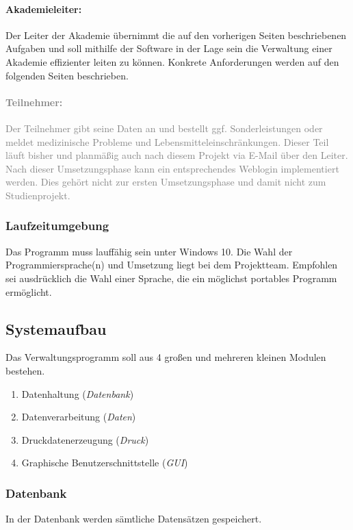 \documentclass[a4paper]{scrartcl}
\begin{document}
	\paragraph{Akademieleiter:}
	Der Leiter der Akademie übernimmt die auf den vorherigen Seiten beschriebenen Aufgaben und soll mithilfe der Software in der Lage sein die Verwaltung einer Akademie effizienter leiten zu können. Konkrete Anforderungen werden auf den folgenden Seiten beschrieben.
	\textcolor{gray}{\paragraph{Teilnehmer:}
	Der Teilnehmer gibt seine Daten an und bestellt ggf. Sonderleistungen oder meldet medizinische Probleme und Lebensmitteleinschränkungen. Dieser Teil läuft bisher und planmäßig auch nach diesem Projekt via E-Mail über den Leiter. Nach dieser Umsetzungsphase kann ein entsprechendes Weblogin implementiert werden. Dies gehört nicht zur ersten Umsetzungsphase und damit nicht zum Studienprojekt.}

	\subsubsection{Laufzeitumgebung}
	Das Programm muss lauffähig sein unter Windows 10. Die Wahl der Programmiersprache(n) und Umsetzung liegt bei dem Projektteam. Empfohlen sei ausdrücklich die Wahl einer Sprache, die ein möglichst portables Programm ermöglicht.

	\subsection{Systemaufbau}
	
	Das Verwaltungsprogramm soll aus 4 großen und mehreren kleinen Modulen bestehen.
	
	\begin{enumerate}
		\item Datenhaltung (\emph{Datenbank})
		\item Datenverarbeitung (\emph{Daten})
		\item Druckdatenerzeugung (\emph{Druck})
		\item Graphische Benutzerschnittstelle (\emph{GUI})
	\end{enumerate}

	\subsubsection{Datenbank}
	In der Datenbank werden sämtliche Datensätzen gespeichert.
\end{document}
